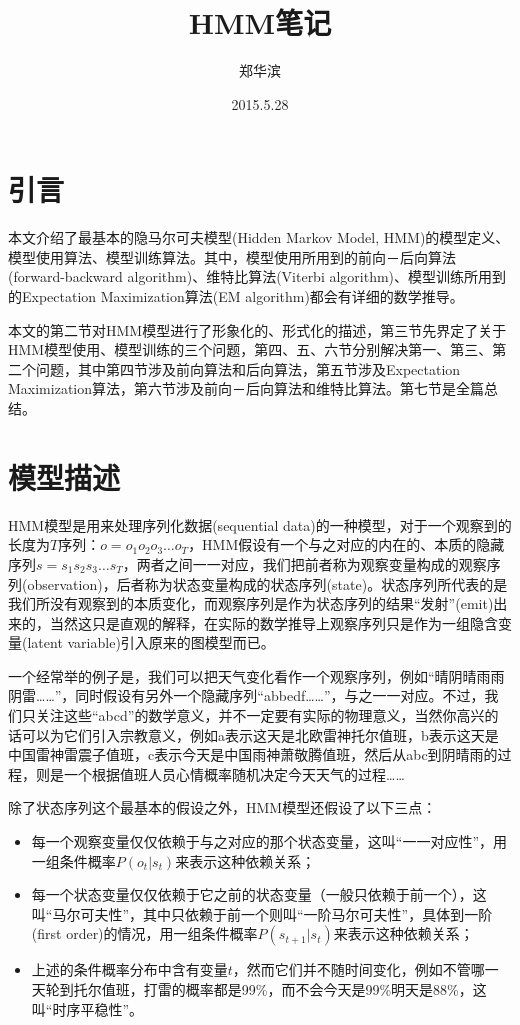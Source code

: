 \documentclass[11pt,a4paper]{article}
\numberwithin{equation}{section}
\begin{document}
 

\title{HMM笔记} 
\author{郑华滨} 
\date{2015.5.28}
\maketitle
\renewcommand\contentsname{目\quad 录}
\tableofcontents
\newpage

\section{引言}

本文介绍了最基本的隐马尔可夫模型(Hidden Markov Model, HMM)的模型定义、模型使用算法、模型训练算法。其中，模型使用所用到的前向－后向算法(forward-backward algorithm)、维特比算法(Viterbi algorithm)、模型训练所用到的Expectation Maximization算法(EM algorithm)都会有详细的数学推导。

本文的第二节对HMM模型进行了形象化的、形式化的描述，第三节先界定了关于HMM模型使用、模型训练的三个问题，第四、五、六节分别解决第一、第三、第二个问题，其中第四节涉及前向算法和后向算法，第五节涉及Expectation Maximization算法，第六节涉及前向－后向算法和维特比算法。第七节是全篇总结。

\section{模型描述}

HMM模型是用来处理序列化数据(sequential data)的一种模型，对于一个观察到的长度为$ T $序列：$ o = o_1 o_2 o_3 \ldots o_T $，HMM假设有一个与之对应的内在的、本质的隐藏序列$ s = s_1 s_2 s_3 \ldots s_T $，两者之间一一对应，我们把前者称为观察变量构成的观察序列(observation)，后者称为状态变量构成的状态序列(state)。状态序列所代表的是我们所没有观察到的本质变化，而观察序列是作为状态序列的结果“发射”(emit)出来的，当然这只是直观的解释，在实际的数学推导上观察序列只是作为一组隐含变量(latent variable)引入原来的图模型而已。

一个经常举的例子是，我们可以把天气变化看作一个观察序列，例如“晴阴晴雨雨阴雷……”，同时假设有另外一个隐藏序列“abbedf……”，与之一一对应。不过，我们只关注这些“abcd”的数学意义，并不一定要有实际的物理意义，当然你高兴的话可以为它们引入宗教意义，例如a表示这天是北欧雷神托尔值班，b表示这天是中国雷神雷震子值班，c表示今天是中国雨神萧敬腾值班，然后从abc到阴晴雨的过程，则是一个根据值班人员心情概率随机决定今天天气的过程……

除了状态序列这个最基本的假设之外，HMM模型还假设了以下三点：
\begin{itemize}
\item 每一个观察变量仅仅依赖于与之对应的那个状态变量，这叫“一一对应性”，用一组条件概率$ P(o_t | s_t) $来表示这种依赖关系；
\item 每一个状态变量仅仅依赖于它之前的状态变量（一般只依赖于前一个），这叫“马尔可夫性”，其中只依赖于前一个则叫“一阶马尔可夫性”，具体到一阶(first order)的情况，用一组条件概率$ P(s_{t + 1} | s_t) $来表示这种依赖关系；
\item 上述的条件概率分布中含有变量$ t $，然而它们并不随时间变化，例如不管哪一天轮到托尔值班，打雷的概率都是99\%，而不会今天是99\%明天是88\%，这叫“时序平稳性”。
\end{itemize}
\end{document}
